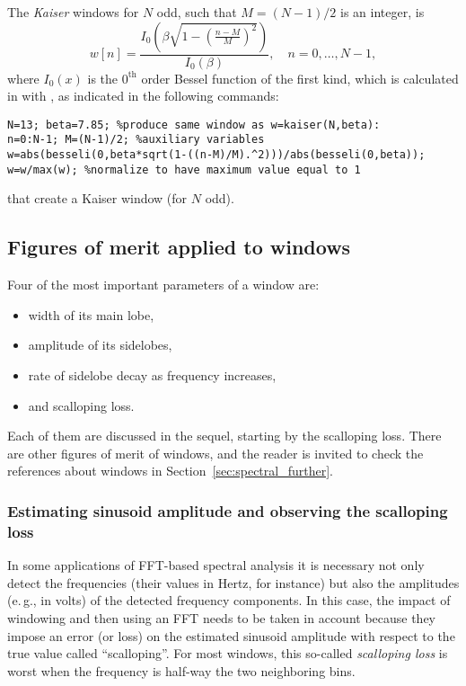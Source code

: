 The \emph{Kaiser} windows for $N$ odd, such that $M=(N-1)/2$ is an integer, is
\begin{equation}
w[n] =  \frac{I_0 \left( \beta \sqrt{1 - \left(\frac{n-M}{M} \right)^2 } \right)}{I_0 \left(\beta \right)}, \textrm{~~~}n=0,\ldots,N-1,
\label{eq:kaiserWindow}
\end{equation}
where $I_0(x)$ is the $0^{\textrm{th}}$ order Bessel function of the first kind, which is calculated in {\matlab} with , as indicated in the following commands:
\begin{lstlisting}
N=13; beta=7.85; %produce same window as w=kaiser(N,beta):
n=0:N-1; M=(N-1)/2; %auxiliary variables
w=abs(besseli(0,beta*sqrt(1-((n-M)/M).^2)))/abs(besseli(0,beta));
w=w/max(w); %normalize to have maximum value equal to 1
\end{lstlisting}
 that create a Kaiser window (for $N$ odd).

\subsection{Figures of merit applied to windows}

Four of the most important parameters of a window are:
\begin{itemize}
	\item width of its main lobe,
	\item amplitude of its sidelobes,
	\item rate of sidelobe decay as frequency increases,
	\item and scalloping loss.
\end{itemize}
Each of them are discussed in the sequel, starting by the scalloping loss. There are other figures of merit of windows, and the reader is invited to check the references about windows in 
Section~\ref{sec:spectral_further}.

\subsubsection{Estimating sinusoid amplitude and observing the scalloping loss}
\label{sec:sin_amplitude}

In some applications of FFT-based spectral analysis it is necessary not only detect the frequencies (their values in Hertz, for instance) but also the amplitudes (e.\,g., in volts) of the detected frequency components. In this case, the impact of windowing and then using an FFT needs to be taken in account because they impose an error (or loss) on the estimated sinusoid amplitude with respect
to the true value called ``scalloping''. 
For most windows, this so-called \emph{scalloping loss} is worst when the frequency is half-way the two neighboring bins.


